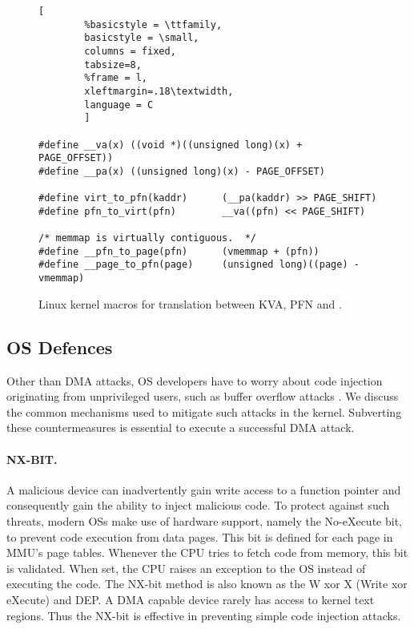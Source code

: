 
\begin{figure*}[t]
                \begin{lstlisting}[
        %basicstyle = \ttfamily,
        basicstyle = \small,
        columns = fixed,
        tabsize=8,
        %frame = l,
        xleftmargin=.18\textwidth,
        language = C
        ]
        
#define __va(x) ((void *)((unsigned long)(x) + PAGE_OFFSET))
#define __pa(x) ((unsigned long)(x) - PAGE_OFFSET)

#define virt_to_pfn(kaddr)      (__pa(kaddr) >> PAGE_SHIFT)
#define pfn_to_virt(pfn)        __va((pfn) << PAGE_SHIFT)

/* memmap is virtually contiguous.  */
#define __pfn_to_page(pfn)      (vmemmap + (pfn))  
#define __page_to_pfn(page)     (unsigned long)((page) - vmemmap)
                \end{lstlisting}
        \caption{ Linux kernel macros for translation between KVA, PFN and \page{}.
                }
        \label{fig:mem_model}
\end{figure*}

\subsection{OS Defences}

Other than DMA attacks, OS developers have to worry about code injection originating from unprivileged users, such as buffer overflow attacks \cite{nx, kalsr}.
We discuss the common mechanisms used to mitigate such attacks in the kernel. Subverting these countermeasures is essential to execute a successful DMA attack.

\paragraph{NX-BIT.}\label{sec:nx-bit}

A malicious device can inadvertently gain write access to a function pointer and consequently gain the ability to inject malicious code. 
To protect against such threats, modern OSs make use of hardware support, namely the No-eXecute bit, to prevent code execution from data pages. This bit is defined for each page in MMU’s page tables. Whenever the CPU tries to fetch code from memory, this bit is validated. When set, the CPU raises an exception to the OS instead of executing the code. The NX-bit method is also known as the W xor X (Write xor eXecute) and DEP. 
A DMA capable device rarely has access to kernel text regions. Thus the NX-bit is effective in preventing simple code injection attacks.

